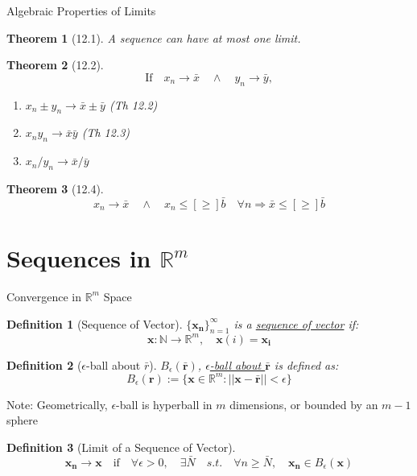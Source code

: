 \documentclass[final]{beamer}
\newtheorem{defn}{Definition}
\newtheorem{thm}{Theorem}
\begin{document}
\begin{frame}[t]{Algebraic Properties of Limits}
	\begin{thm}
		[12.1] A sequence can have at most one limit.
	\end{thm}
	\begin{thm}
		[12.2]
		\[
			\text{If}\quad x_n \rightarrow \bar x \quad\land\quad y_n \rightarrow \bar y, 
		\]
		\begin{enumerate}
			\item $x_n\pm y_n \rightarrow \bar x \pm \bar y$ (Th 12.2)
			\item $x_n y_n \rightarrow \bar x \bar y$ (Th 12.3)
			\item $x_n / y_n \rightarrow \bar x / \bar y $
		\end{enumerate}
	\end{thm}
	\begin{thm}
		[12.4] \[
			x_n \rightarrow \bar x \quad\land\quad x_n \le[\ge] \bar b\quad\forall n \Rightarrow \bar x \le[\ge] \bar b 
		\]
	\end{thm}
\end{frame}

\section{Sequences in $\mathbb{R}^m$} %
\label{sec:sequences_in_mathbb_r_m}
\begin{frame}[t]{Convergence in $\mathbb{R}^m$ Space}
	\begin{defn}
		[Sequence of Vector]
		$\{\mathbf{x_n}\}_{n=1}^\infty$ is a \uline{sequence of vector} if:
		\[
			\mathbf{x}:\mathbb{N}\rightarrow \mathbb{R}^m,\quad \mathbf{x}(i) = \mathbf{x_i} 
		\]
	\end{defn}
	\begin{defn}
		[$\epsilon$-ball about $\bar r$]
		$B_\epsilon( \mathbf{\bar r})$, \uline{$\epsilon$-ball about $\mathbf{\bar  r}$} is defined as:
		\[
			B_\epsilon(\mathbf{r}):=\{\mathbf{x}\in\mathbb{R}^m: ||\mathbf{x-\bar r}||<\epsilon \}
		\]
	\end{defn}
	Note: Geometrically, $\epsilon$-ball is hyperball in $m$ dimensions, or bounded by an $m-1$ sphere
	\begin{defn}
		[Limit of a Sequence of Vector]
		\[
			\mathbf{x_n}\rightarrow\mathbf{x} \quad\text{if}\quad \forall\epsilon>0,\quad\exists \bar N \quad s.t.\quad \forall n\ge\bar N,\quad \mathbf{x_n}\in B_\epsilon(\mathbf{x})
		\]
	\end{defn}
\end{frame}
\end{document}
